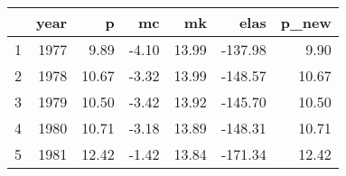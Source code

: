 \begin{tabular}{rrrrrrr}
  \hline
 & year & p & mc & mk & elas & p\_new \\ 
  \hline
1 & 1977 & 9.89 & -4.10 & 13.99 & -137.98 & 9.90 \\ 
  2 & 1978 & 10.67 & -3.32 & 13.99 & -148.57 & 10.67 \\ 
  3 & 1979 & 10.50 & -3.42 & 13.92 & -145.70 & 10.50 \\ 
  4 & 1980 & 10.71 & -3.18 & 13.89 & -148.31 & 10.71 \\ 
  5 & 1981 & 12.42 & -1.42 & 13.84 & -171.34 & 12.42 \\ 
   \hline
\end{tabular}
